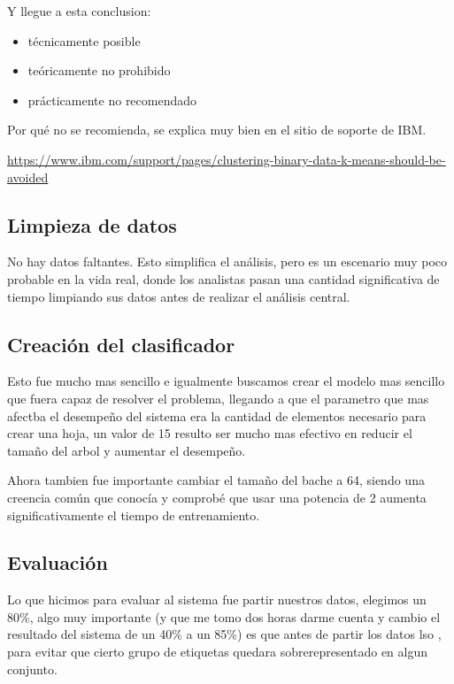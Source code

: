 \documentclass[12pt, fleqn]{report}                             %
\newcommand \Quote              {\qq}                           %
\theoremstyle{break}                                            %
\begin{document}
        Y llegue a esta conclusion:
        \begin{itemize}
            \item técnicamente posible
            \item teóricamente no prohibido
            \item prácticamente no recomendado
        \end{itemize}
            
        Por qué no se recomienda, se explica muy bien en el sitio de soporte de IBM. 

        \url{https://www.ibm.com/support/pages/clustering-binary-data-k-means-should-be-avoided}


        \subsection{Limpieza de datos}
            No hay datos faltantes. Esto simplifica el análisis, pero es un escenario muy poco probable 
            en la vida real, donde los analistas pasan una cantidad significativa de tiempo limpiando 
            sus datos antes de realizar el análisis central.

        \subsection{Creación del clasificador}

        Esto fue mucho mas sencillo e igualmente buscamos crear el modelo mas sencillo que fuera capaz de resolver el problema, llegando
        a que el parametro que mas afectba el desempeño del sistema era la cantidad de elementos necesario para crear una hoja,
        un valor de 15 resulto ser mucho mas efectivo en reducir el tamaño del arbol y aumentar el desempeño.

        Ahora tambien fue importante cambiar el tamaño del bache a 64, siendo una creencia común que conocía y comprobé que usar 
        una potencia de 2 aumenta significativamente el tiempo de entrenamiento.

        \subsection{Evaluación}

        Lo que hicimos para evaluar al sistema fue partir nuestros datos, elegimos un 80\%, algo muy importante (y que me tomo dos horas
        darme cuenta y cambio el resultado del sistema de un 40\% a un 85\%) es que antes de partir los datos lso \Quote{revolvimos},
        para evitar que cierto grupo de etiquetas quedara sobrerepresentado en algun conjunto.
\end{document}
